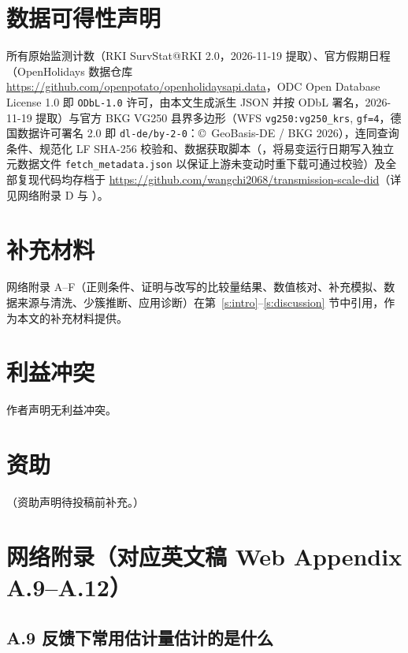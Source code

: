 \documentclass[11pt,a4paper]{ctexart}
\theoremstyle{definition}
\begin{document}
\section*{数据可得性声明}
所有原始监测计数（RKI SurvStat@RKI 2.0，2026-11-19 提取）、官方假期日程（OpenHolidays 数据仓库 \url{https://github.com/openpotato/openholidaysapi.data}，ODC Open Database License 1.0 即 \texttt{ODbL-1.0} 许可，由本文生成派生 JSON 并按 ODbL 署名，2026-11-19 提取）与官方 BKG VG250 县界多边形（WFS \texttt{vg250:vg250\_krs}, \texttt{gf=4}，德国数据许可署名 2.0 即 \texttt{dl-de/by-2-0}：\copyright\ GeoBasis-DE / BKG 2026），连同查询条件、规范化 LF SHA-256 校验和、数据获取脚本（，将易变运行日期写入独立元数据文件 \texttt{fetch\_metadata.json} 以保证上游未变动时重下载可通过校验）及全部复现代码均存档于 \url{https://github.com/wangchi2068/transmission-scale-did}（详见网络附录 D 与 ）。

\section*{补充材料}
网络附录 A--F（正则条件、证明与改写的比较量结果、数值核对、补充模拟、数据来源与清洗、少簇推断、应用诊断）在第~\ref{s:intro}--\ref{s:discussion} 节中引用，作为本文的补充材料提供。

\section*{利益冲突}
作者声明无利益冲突。

\section*{资助}
（资助声明待投稿前补充。）

\appendix
\section*{网络附录（对应英文稿 Web Appendix A.9--A.12）}
\setcounter{section}{0}
\setcounter{equation}{0}
\renewcommand{\theequation}{A.\arabic{equation}}

\subsection*{A.9 反馈下常用估计量估计的是什么}
\label{ss:bias}
\end{document}
